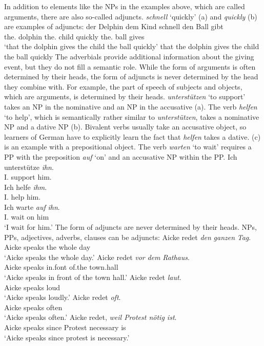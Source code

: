 In addition to elements like the NPs in the examples above, which are called arguments,
there are also so-called adjuncts. \emph{schnell} `quickly' (a) and \emph{quickly} (b)
are examples of adjuncts:
\eal
\ex
\gll \dass{} der        Delphin dem        Kind  schnell den        Ball gibt\\
     \that{} the.\NOM{} dolphin the.\DAT{} child quickly the.\ACC{} ball gives\\
\glt `that the dolphin gives the child the ball quickly'
\ex that the dolphin gives the child the ball quickly
\zl
The adverbials provide additional information about the giving event, but they do not fill a
semantic role. While the form of arguments is often determined by their
heads, the form of adjuncts is never determined by the head they combine with. For example, the part
of speech of subjects and objects, which are arguments, is determined by their
heads. \emph{unterstützen} `to support' takes an NP in the nominative and an NP in the
accusative (a). The verb \emph{helfen} `to help', which is semantically rather similar to
\emph{unterstützen}, takes a nominative NP and a dative NP (b). Bivalent verbs usually take an accusative
object, so learners of German have to explicitly learn the fact that \emph{helfen} takes a
dative. (c) is an example with a prepositional object. The verb \emph{warten} `to wait'
requires a PP with the preposition \emph{auf} `on' and an accusative NP within the PP.
\eal
\ex 
\gll Ich unterstütze  \emph{ihn}.\\
     I.\NOM{} support him.\ACC\\\german
\ex 
\gll Ich helfe \emph{ihm}.\\
     I.\NOM{} help him.\DAT\\
\ex 
\gll Ich warte \emph{auf} \emph{ihn}.\\
     I.\NOM{} wait on him\\
\glt `I wait for him.'
\zl
The form of adjuncts are never determined by their heads. NPs, PPs, adjectives, adverbs, clauses can
be adjuncts:
\eal
\ex 
\gll Aicke redet \emph{den} \emph{ganzen} \emph{Tag}.\\
     Aicke speaks the whole day\\\german
\glt `Aicke speaks the whole day.'
\ex 
\gll Aicke redet \emph{vor} \emph{dem} \emph{Rathaus}.\\
     Aicke speaks in.font of.the town.hall\\
\glt `Aicke speaks in front of the town hall.'
\ex 
\gll Aicke redet \emph{laut}.\\
     Aicke speaks loud\\
\glt `Aicke speaks loudly.'
\ex 
\gll Aicke redet \emph{oft}.\\
     Aicke speaks often\\
\glt `Aicke speaks often.'
\ex 
\gll Aicke redet, \emph{weil Protest nötig ist}.\\
     Aicke speaks since Protest necessary is\\
\glt `Aicke speaks since protest is necessary.' 
\zl

